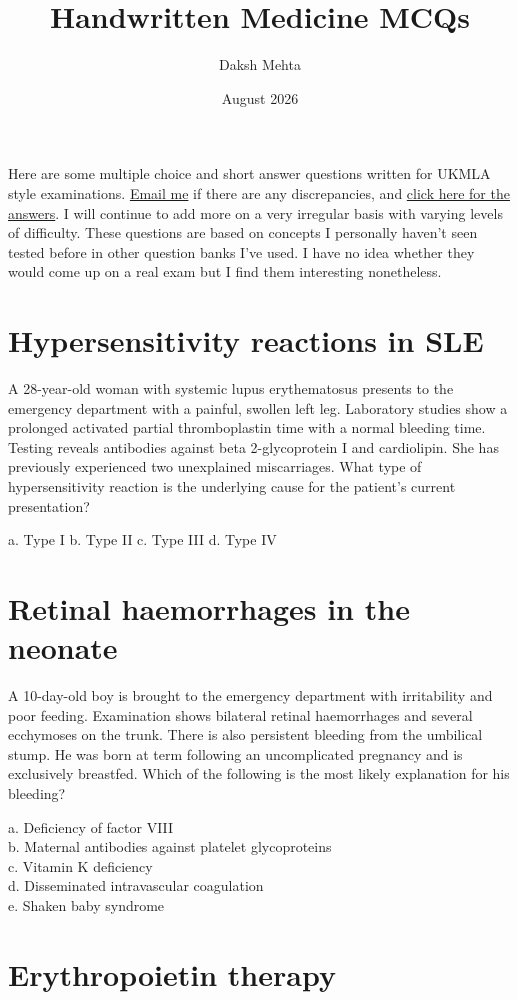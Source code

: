 \documentclass{article}
\title{Handwritten Medicine MCQs}
\date{August 2026}
\author{Daksh Mehta}
\begin{document}
	
Here are some multiple choice and short answer questions written for UKMLA style examinations. \href{mailto:daksh1111@proton.me}{Email me} if there are any discrepancies, and \href{handwritten-medicine-mcq-answers.html}{click here for the answers}. I will continue to add more on a very irregular basis with varying levels of difficulty. These questions are based on concepts I personally haven't seen tested before in other question banks I've used. I have no idea whether they would come up on a real exam but I find them interesting nonetheless. 

\tableofcontents

\section{Hypersensitivity reactions in SLE}

A 28-year-old woman with systemic lupus erythematosus presents to the emergency department with a painful, swollen left leg. Laboratory studies show a prolonged activated partial thromboplastin time with a normal bleeding time. Testing reveals antibodies against beta 2-glycoprotein I and cardiolipin. She has previously experienced two unexplained miscarriages. What type of hypersensitivity reaction is the underlying cause for the patient's current presentation?

a. Type I  
b. Type II  
c. Type III  
d. Type IV

\section{Retinal haemorrhages in the neonate}

A 10-day-old boy is brought to the emergency department with irritability and poor feeding. Examination shows bilateral retinal haemorrhages and several ecchymoses on the trunk. There is also persistent bleeding from the umbilical stump. He was born at term following an uncomplicated pregnancy and is exclusively breastfed. Which of the following is the most likely explanation for his bleeding?

a. Deficiency of factor VIII \\
b. Maternal antibodies against platelet glycoproteins \\
c. Vitamin K deficiency \\ 
d. Disseminated intravascular coagulation \\
e. Shaken baby syndrome

\section{Erythropoietin therapy}
\end{document}
